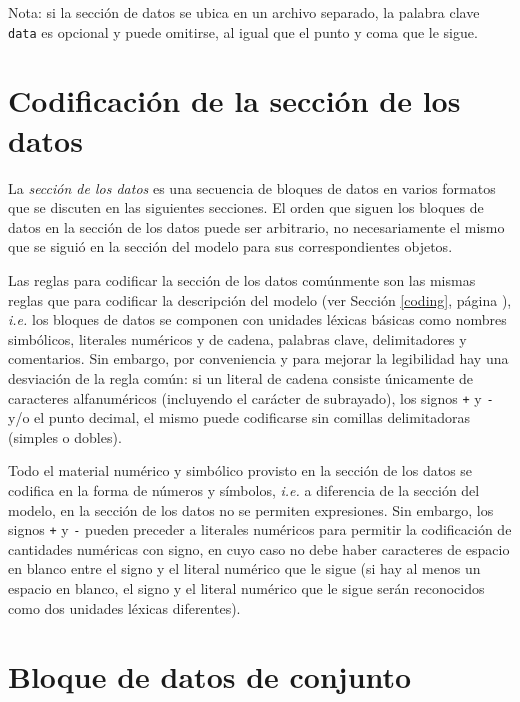 \documentclass[11pt,spanish]{report}
\begin{document}
\bigskip

Nota: si la sección de datos se ubica en un archivo separado, la palabra clave {\tt data} es opcional y puede omitirse, al igual que el punto y coma que le sigue.

\section{Codificación de la sección de los datos}

La {\it sección de los datos} es una secuencia de bloques de datos en varios formatos que se discuten en las siguientes secciones. El orden que siguen los bloques de datos en la sección de los datos puede ser arbitrario, no necesariamente el mismo que se siguió en la sección del modelo para sus correspondientes objetos.

Las reglas para codificar la sección de los datos comúnmente son las mismas reglas que para codificar la descripción del modelo (ver Sección \ref{coding}, página \pageref{coding}), {\it i.e.} los bloques de datos se componen con unidades léxicas básicas como nombres simbólicos, literales numéricos y de cadena, palabras clave, delimitadores y comentarios. Sin embargo, por conveniencia y para mejorar la legibilidad hay una desviación de la regla común: si un literal de cadena consiste únicamente de caracteres alfanuméricos (incluyendo el carácter de subrayado), los signos {\tt+} y {\tt-} y/o el punto decimal, el mismo puede codificarse sin comillas delimitadoras (simples o dobles).

Todo el material numérico y simbólico provisto en la sección de los datos se codifica en la forma de números y símbolos, {\it i.e.} a diferencia de la sección del modelo, en la sección de los datos no se permiten expresiones. Sin embargo, los signos {\tt+} y {\tt-} pueden preceder a literales numéricos para permitir la codificación de cantidades numéricas con signo, en cuyo caso no debe haber caracteres de espacio en blanco entre el signo y el literal numérico que le sigue (si hay al menos un espacio en blanco, el signo y el literal numérico que le sigue serán reconocidos como dos unidades léxicas diferentes).

\newpage

\section{Bloque de datos de conjunto}

\noindent
{}
\end{document}
